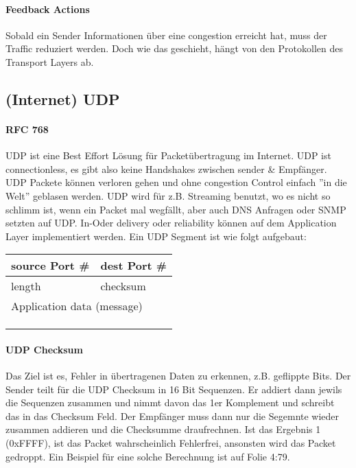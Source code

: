 			\paragraph{Feedback Actions}
				Sobald ein Sender Informationen über eine congestion erreicht hat, muss der Traffic reduziert werden. Doch wie das geschieht, hängt von den Protokollen des Transport Layers ab.

	\subsection{(Internet) UDP}
		\paragraph{RFC 768} 
			UDP ist eine Best Effort Lösung für Packetübertragung im Internet. UDP ist connectionless, es gibt also keine Handshakes zwischen sender \& Empfänger. UDP Packete können verloren gehen und ohne congestion Control einfach ''in die Welt'' geblasen werden. UDP wird für z.B. Streaming benutzt, wo es nicht so schlimm ist, wenn ein Packet mal wegfällt, aber auch DNS Anfragen oder SNMP setzten auf UDP. In-Oder delivery oder reliability können auf dem Application Layer implementiert werden. Ein UDP Segment ist wie folgt aufgebaut:
			\begin{table}[h]
				\centering
				\begin{tabular}{|l|l|l|l|l|l|l|l|}
				\hline
				\multicolumn{4}{|l|}{source Port \#} & \multicolumn{4}{l|}{dest Port \#} \\ \hline
				\multicolumn{4}{|l|}{length}         & \multicolumn{4}{l|}{checksum}     \\ \hline
				\multicolumn{8}{|l|}{Application data (message)}        				 \\
				\multicolumn{8}{|l|}{}                                                   \\
				\multicolumn{8}{|l|}{}                                                   \\
				\multicolumn{8}{|l|}{}                                                   \\ \hline
				\end{tabular}
			\end{table}

		\paragraph{UDP Checksum}
			Das Ziel ist es, Fehler in übertragenen Daten zu erkennen, z.B. geflippte Bits. Der Sender teilt für die UDP Checksum in 16 Bit Sequenzen. Er addiert dann jewils die Sequenzen zusammen und nimmt davon das 1er Komplement und schreibt das in das Checksum Feld. Der Empfänger muss dann nur die Segemnte wieder zusammen addieren und die Checksumme draufrechnen. Ist das Ergebnis 1 (0xFFFF), ist das Packet wahrscheinlich Fehlerfrei, ansonsten wird das Packet gedroppt. Ein Beispiel für eine solche Berechnung ist auf Folie 4:79.

